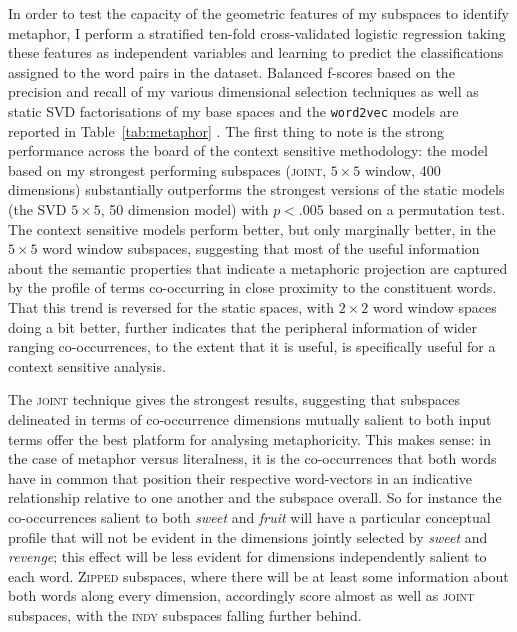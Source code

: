 In order to test the capacity of the geometric features of my subspaces to identify metaphor, I perform a stratified ten-fold cross-validated logistic regression taking these features as independent variables and learning to predict the classifications assigned to the word pairs in the dataset.  Balanced f-scores based on the precision and recall of my various dimensional selection techniques as well as static SVD factorisations of my base spaces and the \texttt{word2vec} models are reported in Table~\ref{tab:metaphor} .  The first thing to note is the strong performance across the board of the context sensitive methodology: the model based on my strongest performing subspaces (\textsc{joint}, $5 \times 5$ window, 400 dimensions) substantially outperforms the strongest versions of the static models (the SVD $5 \times 5$, 50 dimension model) with $p < .005$ based on a permutation test.  The context sensitive models perform better, but only marginally better, in the $5 \times 5$ word window subspaces, suggesting that most of the useful information about the semantic properties that indicate a metaphoric projection are captured by the profile of terms co-occurring in close proximity to the constituent words.  That this trend is reversed for the static spaces, with $2 \times 2$ word window spaces doing a bit better, further indicates that the peripheral information of wider ranging co-occurrences, to the extent that it is useful, is specifically useful for a context sensitive analysis.

The \textsc{joint} technique gives the strongest results, suggesting that subspaces delineated in terms of co-occurrence dimensions mutually salient to both input terms offer the best platform for analysing metaphoricity.  This makes sense: in the case of metaphor versus literalness, it is the co-occurrences that both words have in common that position their respective word-vectors in an indicative relationship relative to one another and the subspace overall.  So for instance the co-occurrences salient to both \emph{sweet} and \emph{fruit} will have a particular conceptual profile that will not be evident in the dimensions jointly selected by \emph{sweet} and \emph{revenge}; this effect will be less evident for dimensions independently salient to each word.  \textsc{Zipped} subspaces, where there will be at least some information about both words along every dimension, accordingly score almost as well as \textsc{joint} subspaces, with the \textsc{indy} subspaces falling further behind.

